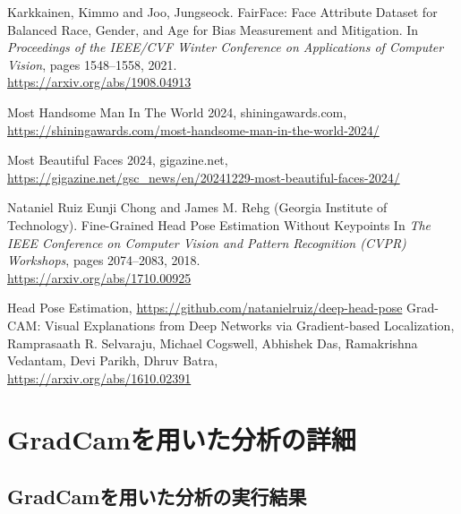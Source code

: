 \documentclass[a4paper,11pt,titlepage]{jsarticle}
\begin{document}
\begin{thebibliography}{9}
    Karkkainen, Kimmo and Joo, Jungseock.
    FairFace: Face Attribute Dataset for Balanced Race, Gender, and Age for Bias Measurement and Mitigation.
    In \textit{Proceedings of the IEEE/CVF Winter Conference on Applications of Computer Vision}, pages 1548--1558, 2021.\\
        \url{https://arxiv.org/abs/1908.04913}
    
    Most Handsome Man In The World 2024, shiningawards.com, \\
    \url{https://shiningawards.com/most-handsome-man-in-the-world-2024/}
    
    Most Beautiful Faces 2024, gigazine.net, \\ \url{https://gigazine.net/gsc_news/en/20241229-most-beautiful-faces-2024/}
    
        Nataniel Ruiz Eunji Chong and James M. Rehg (Georgia Institute of Technology).
        Fine-Grained Head Pose Estimation Without Keypoints
         In \textit{The IEEE Conference on Computer Vision and Pattern Recognition (CVPR) Workshops}, pages 2074--2083, 2018. \\
          \url{https://arxiv.org/abs/1710.00925}

    Head Pose Estimation, \url{https://github.com/natanielruiz/deep-head-pose}
    Grad-CAM: Visual Explanations from Deep Networks via Gradient-based Localization, 
    Ramprasaath R. Selvaraju, Michael Cogswell, Abhishek Das, Ramakrishna Vedantam, Devi Parikh, Dhruv Batra,\\
    \url{https://arxiv.org/abs/1610.02391}
    
\end{thebibliography}


\clearpage
\appendix %
\section{GradCamを用いた分析の詳細}

\subsection{GradCamを用いた分析の実行結果}
\end{document}
